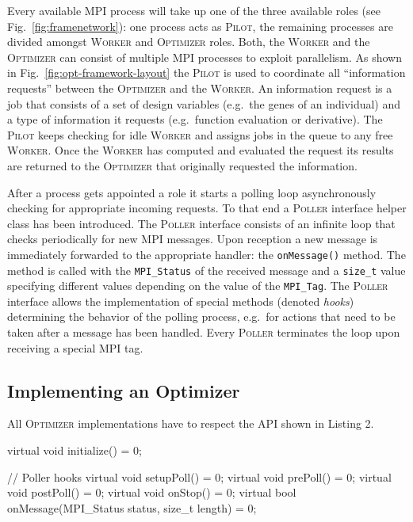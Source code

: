 \documentclass[%
preprint,
preprint,
linenumbers,
amsmath,amssymb,
aps,
prstab,
]{revtex4-1}
\begin{document}
Every available MPI process will take up one of the three available roles (see
  Fig.~\ref{fig:framenetwork}):  one process acts as \textsc{Pilot}, the
  remaining processes are divided amongst \textsc{Worker} and
  \textsc{Optimizer} roles.
Both, the \textsc{Worker} and the \textsc{Optimizer} can consist of multiple
  MPI processes to exploit parallelism.
As shown in Fig.~\ref{fig:opt-framework-layout} the \textsc{Pilot} is used
  to coordinate all ``information requests'' between the \textsc{Optimizer}
  and the \textsc{Worker}.
An information request is a job that consists of a set of design variables
  (e.g.~the genes of an individual) and a type of information it requests
  (e.g.~function evaluation or derivative).
The \textsc{Pilot} keeps checking for idle \textsc{Worker} and assigns jobs
  in the queue to any free \textsc{Worker}.
Once the \textsc{Worker} has computed and evaluated the request its results
  are returned to the \textsc{Optimizer} that originally requested the
  information.

After a process gets appointed a role it starts a polling loop asynchronously
  checking for appropriate incoming requests.
To that end a \textsc{Poller} interface helper class has been introduced.
The \textsc{Poller} interface consists of an infinite loop that checks
  periodically for new MPI messages.
Upon reception a new message is immediately forwarded to the appropriate
  handler: the \texttt{onMessage()} method.
The method is called with the \texttt{MPI\_Status} of the received message and
  a \texttt{size\_t} value specifying different values depending on the value
  of the \texttt{MPI\_Tag}.
The \textsc{Poller} interface allows the implementation of special methods
  (denoted \textit{hooks}) determining the behavior of the polling process,
  e.g.\ for actions that need to be taken after a message has been handled.
Every \textsc{Poller} terminates the loop upon receiving a special MPI tag.


\subsection{Implementing an Optimizer}

All \textsc{Optimizer} implementations have to respect the API shown in
Listing 2.

\begin{code}
virtual void initialize() = 0;

// Poller hooks
virtual void setupPoll() = 0;
virtual void prePoll() = 0;
virtual void postPoll() = 0;
virtual void onStop() = 0;
virtual bool onMessage(MPI_Status status,
                       size_t length) = 0;
\end{code}
\end{document}
